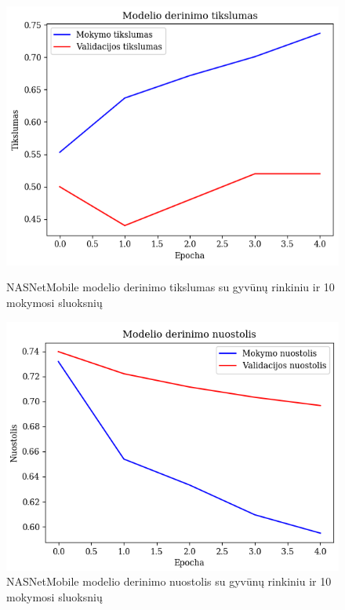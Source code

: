 \documentclass{VUMIFPSbakalaurinis}
\begin{document}
\begin{figure}[!htbp]
    \centering
    \begin{minipage}[b]{0.48\textwidth}
      \includegraphics[width=\textwidth]{img/GrapthsNEW/Small/animal/10/Acc_DC_S_10.png}
      \caption{NASNetMobile modelio derinimo tikslumas su gyvūnų rinkiniu ir 10 mokymosi sluoksnių}
    \end{minipage}
    \hspace{2mm}
    \begin{minipage}[b]{0.48\textwidth}
      \includegraphics[width=\textwidth]{img/GrapthsNEW/Small/animal/10/Loss_DC_S_10.png}
      \caption{NASNetMobile modelio derinimo nuostolis su gyvūnų rinkiniu ir 10 mokymosi sluoksnių}
    \end{minipage}
\end{figure}
\end{document}

